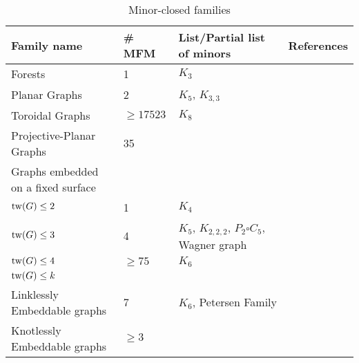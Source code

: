 \begin{table}[h!]
    
    \centering
    \caption{Minor-closed families}\label{tab:minor-closed families}
    \begin{tabular*}{\textwidth}{@{}llll@{}}
    \toprule
    Family name                  & \# MFM & List/Partial list of minors                      & References \\ \midrule
    Forests                      & 1                                  & $K_3$                                            &            \\
    Planar Graphs                & 2                                  & $K_5$, $K_{3,3}$                                 & \tablefootnote{\textcite{wagnerUeberEigenschaftEbenen1937}}           \\
    Toroidal Graphs              & $\geq 17523$                       & $K_8$                                            & \tablefootnote{\textcite{myrvoldLargeSetTorus2018}}           \\
    Projective-Planar Graphs     & 35                                 &                                   & \tablefootnote{\textcite{archdeaconKuratowskiTheoremProjective1980}}           \\
    Graphs embedded on a fixed surface & & &\\
    $\operatorname{tw}(G) \leq 2$              & 1                                  & $K_4$                                            &            \\
    $\operatorname{tw}(G) \leq 3$              & 4                                  & $K_5$, $K_{2,2,2}$, $P_2 \square C_5$, Wagner graph & \tablefootnote{\textcite{arnborgForbiddenMinorsCharacterization1990}}           \\
    $\operatorname{tw}(G) \leq 4$              & $\geq 75$                          & $K_6$                                            & \tablefootnote{\textcite{sandersLinearAlgorithmsGraphs1993}}           \\
    $\operatorname{tw}(G) \leq k$              &                                    &                                                  &            \\
    Linklessly Embeddable graphs & 7                                  & $K_6$, Petersen Family                           & \tablefootnote{\textcite{robertsonLinklessEmbeddingsGraphs1993}} \\
    Knotlessly Embeddable graphs & $\geq 3$                           &                                                  & \tablefootnote{\textcite{conwayKnotsLinksSpatial1983,foisyIntrinsicallyKnottedGraphs2002,foisyNewlyRecognizedIntrinsically2003}}\\
    \bottomrule
    \end{tabular*}
    
\end{table}
